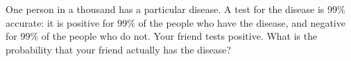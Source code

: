 One person in a thousand has a particular disease. A test for the disease is $99\%$ accurate: it is positive for $99\%$ of the people who have the disease, and negative for $99\%$ of the people who do not. Your friend tests positive. What is the probability that your friend actually has the disease?
